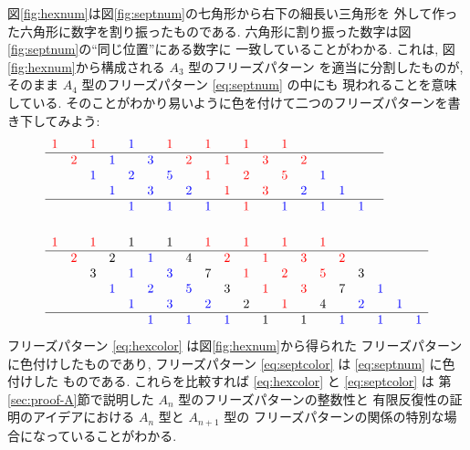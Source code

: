\documentclass[12pt,twoside,dvipdfm]{jarticle}
\newcommand\red{\color{red}}
\newcommand\blue{\color{blue}}
\renewcommand\r{\red}
\renewcommand\b{\blue}
\theoremstyle{definition} %
\theoremstyle{definition} %
\theoremstyle{definition} %
\numberwithin{theorem}{section}
\numberwithin{equation}{section}
\numberwithin{figure}{section}
\numberwithin{table}{section}
\newcommand\secref[1]{第\ref{#1}節}
\newcommand\figureref[1]{図\ref{#1}}
\newcommand\figref[1]{\figureref{#1}}
\begin{document}
\figref{fig:hexnum}は\figref{fig:septnum}の七角形から右下の細長い三角形を
外して作った六角形に数字を割り振ったものである.
六角形に割り振った数字は\figref{fig:septnum}の``同じ位置''にある数字に
一致していることがわかる.
これは, \figref{fig:hexnum}から構成される $A_3$ 型のフリーズパターン
を適当に分割したものが, 
そのまま $A_4$ 型のフリーズパターン \eqref{eq:septnum} の中にも
現われることを意味している.
そのことがわかり易いように色を付けて二つのフリーズパターンを書き下してみよう:
\begin{align}
&
\begin{array}{cccccccccccccccccc}
\r1&   &\r1&   &\b1&   &\r1&   &\r1&   &\r1&   &\r1&   &   &   &   &   \\ \hline
   &\r2&   &\b1&   &\b3&   &\r2&   &\r1&   &\r3&   &\r2&   &   &   &   \\
   &   &\b1&   &\b2&   &\b5&   &\r1&   &\r2&   &\r5&   &\b1&   &   &   \\
   &   &   &\b1&   &\b3&   &\b2&   &\r1&   &\r3&   &\b2&   &\b1&   &   \\ \hline
   &   &   &   &\b1&   &\b1&   &\b1&   &\r1&   &\b1&   &\b1&   &\b1&   \\
\end{array}
\label{eq:hexcolor}
\\[\bigskipamount] &
\begin{array}{cccccccccccccccccccc}
\r1&   &\r1&   & 1 &   & 1 &   &\r1&   &\r1&   &\r1&   &\r1&   &   &   &   &   \\ \hline
   &\r2&   & 2 &   &\b1&   & 4 &   &\r2&   &\r1&   &\r3&   &\r2&   &   &   &   \\
   &   & 3 &   &\b1&   &\b3&   & 7 &   &\r1&   &\r2&   &\r5&   & 3 &   &   &   \\
   &   &   &\b1&   &\b2&   &\b5&   & 3 &   &\r1&   &\r3&   & 7 &   &\b1&   &   \\
   &   &   &   &\b1&   &\b3&   &\b2&   & 2 &   &\r1&   & 4 &   &\b2&   &\b1&   \\ \hline
   &   &   &   &   &\b1&   &\b1&   &\b1&   & 1 &   & 1 &   &\b1&   &\b1&   &\b1\\
\end{array}
\label{eq:septcolor}
\end{align}
フリーズパターン \eqref{eq:hexcolor} は\figref{fig:hexnum}から得られた
フリーズパターンに色付けしたものであり, 
フリーズパターン \eqref{eq:septcolor} は \eqref{eq:septnum} に色付けした
ものである.
これらを比較すれば \eqref{eq:hexcolor} と \eqref{eq:septcolor} は
\secref{sec:proof-A}で説明した $A_n$ 型のフリーズパターンの整数性と
有限反復性の証明のアイデアにおける $A_n$ 型と $A_{n+1}$ 型の
フリーズパターンの関係の特別な場合になっていることがわかる.
\end{document}
